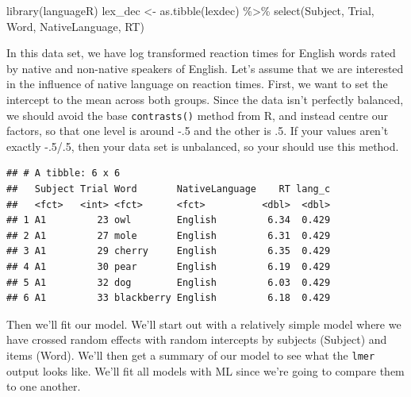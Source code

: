\documentclass[
]{book}
\newenvironment{Shaded}{\begin{snugshade}}{\end{snugshade}}
\newcommand{\CommentTok}[1]{\textcolor[rgb]{0.56,0.35,0.01}{\textit{#1}}}
\newcommand{\FunctionTok}[1]{\textcolor[rgb]{0.00,0.00,0.00}{#1}}
\newcommand{\NormalTok}[1]{#1}
\newcommand{\OtherTok}[1]{\textcolor[rgb]{0.56,0.35,0.01}{#1}}
\newcommand{\SpecialCharTok}[1]{\textcolor[rgb]{0.00,0.00,0.00}{#1}}
\newcommand{\StringTok}[1]{\textcolor[rgb]{0.31,0.60,0.02}{#1}}
\begin{document}
\begin{Shaded}
\begin{Highlighting}[]
\FunctionTok{library}\NormalTok{(languageR)}
\NormalTok{lex\_dec }\OtherTok{\textless{}{-}} \FunctionTok{as.tibble}\NormalTok{(lexdec) }\SpecialCharTok{\%\textgreater{}\%} 
  \FunctionTok{select}\NormalTok{(Subject, Trial, Word, NativeLanguage, RT)}
\end{Highlighting}
\end{Shaded}

In this data set, we have log transformed reaction times for English words rated by native and non-native speakers of English. Let's assume that we are interested in the influence of native language on reaction times. First, we want to set the intercept to the mean across both groups. Since the data isn't perfectly balanced, we should avoid the base \texttt{contrasts()} method from R, and instead centre our factors, so that one level is around -.5 and the other is .5. If your values aren't exactly -.5/.5, then your data set is unbalanced, so your should use this method.

\begin{Shaded}
\end{Shaded}

\begin{verbatim}
## # A tibble: 6 x 6
##   Subject Trial Word       NativeLanguage    RT lang_c
##   <fct>   <int> <fct>      <fct>          <dbl>  <dbl>
## 1 A1         23 owl        English         6.34  0.429
## 2 A1         27 mole       English         6.31  0.429
## 3 A1         29 cherry     English         6.35  0.429
## 4 A1         30 pear       English         6.19  0.429
## 5 A1         32 dog        English         6.03  0.429
## 6 A1         33 blackberry English         6.18  0.429
\end{verbatim}

Then we'll fit our model. We'll start out with a relatively simple model where we have crossed random effects with random intercepts by subjects (Subject) and items (Word). We'll then get a summary of our model to see what the \texttt{lmer} output looks like. We'll fit all models with ML since we're going to compare them to one another.
\end{document}
